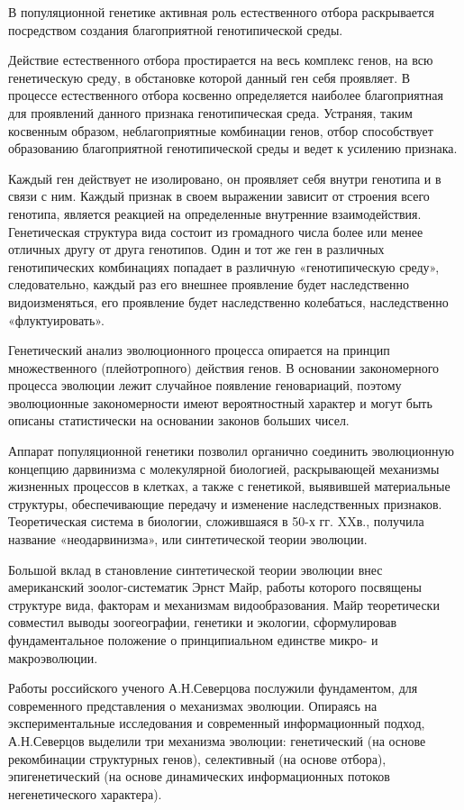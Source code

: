 \documentclass[exam_answers.tex]{subfiles}
\begin{document}
В популяционной генетике активная роль естественного отбора
раскрывается посредством создания благоприятной генотипической среды.

Действие естественного отбора простирается на весь комплекс генов, на
всю генетическую среду, в обстановке которой данный ген себя проявляет. В
процессе естественного отбора косвенно определяется наиболее благоприятная
для проявлений данного признака генотипическая среда. Устраняя, таким
косвенным образом, неблагоприятные комбинации генов, отбор способствует
образованию благоприятной генотипической среды и ведет к усилению
признака.

Каждый ген действует не изолировано, он проявляет себя внутри генотипа
и в связи с ним. Каждый признак в своем выражении зависит от строения всего
генотипа, является реакцией на определенные внутренние взаимодействия.
Генетическая структура вида состоит из громадного числа более или менее
отличных другу от друга генотипов. Один и тот же ген в различных
генотипических комбинациях попадает в различную «генотипическую среду»,
следовательно, каждый раз его внешнее проявление будет наследственно
видоизменяться, его проявление будет наследственно колебаться,
наследственно «флуктуировать».

Генетический анализ эволюционного процесса опирается на принцип
множественного (плейотропного) действия генов. В основании закономерного
процесса эволюции лежит случайное появление геновариаций, поэтому
эволюционные закономерности имеют вероятностный характер и могут быть
описаны статистически на основании законов больших чисел.

Аппарат популяционной генетики позволил органично соединить
эволюционную концепцию дарвинизма с молекулярной биологией,
раскрывающей механизмы жизненных процессов в клетках, а также с
генетикой, выявившей материальные структуры, обеспечивающие передачу и
изменение наследственных признаков. Теоретическая система в биологии,
сложившаяся в 50-х гг. XXв., получила название «неодарвинизма», или
синтетической теории эволюции.

Большой вклад в становление синтетической теории эволюции внес
американский зоолог-систематик Эрнст Майр, работы которого посвящены
структуре вида, факторам и механизмам видообразования. Майр теоретически
совместил выводы зоогеографии, генетики и экологии, сформулировав
фундаментальное положение о принципиальном единстве микро- и
макроэволюции.

Работы российского ученого А.Н.Северцова послужили фундаментом, для
современного представления о механизмах эволюции. Опираясь на
экспериментальные исследования и современный информационный подход,
А.Н.Северцов выделили три механизма эволюции: генетический (на основе
рекомбинации структурных генов), селективный (на основе отбора),
эпигенетический (на основе динамических информационных потоков
негенетического характера).
\end{document}

